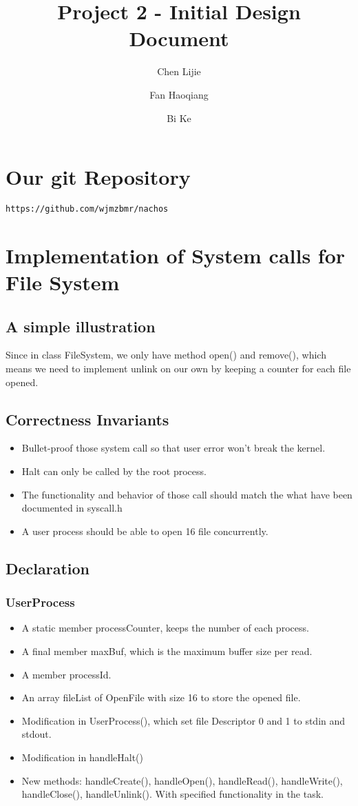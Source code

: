 \documentclass{article}
\title{Project 2 - Initial Design Document}
\author{Chen Lijie\\ \and
	Fan Haoqiang\\ \and
	Bi Ke\\ }
\date{}
\begin{document}
	\maketitle
	\section{Our git Repository}
	\texttt{https://github.com/wjmzbmr/nachos}
	\section{Implementation of System calls for File System}
	\subsection{A simple illustration}
	Since in class FileSystem, we only have method open() and remove(), which means we need to implement unlink on our own by keeping a counter for each file opened.
	\subsection{Correctness Invariants}
	\begin{itemize}
		\item Bullet-proof those system call so that user error won't break the kernel.
		\item Halt can only be called by the root process.
		\item The functionality and behavior of those call should match the what have been documented in syscall.h
		\item A user process should be able to open 16 file concurrently.
	\end{itemize}
	\subsection{Declaration}
	\subsubsection*{UserProcess}
	\begin{itemize}
		\item A static member processCounter, keeps the number of each process.
		\item A final member maxBuf, which is the maximum buffer size per read.
		\item A member processId.
		\item An array fileList of OpenFile with size 16 to store the opened file.
		\item Modification in UserProcess(), which set file Descriptor 0 and 1 to stdin and stdout.
		\item Modification in handleHalt()
		\item New methods: handleCreate(), handleOpen(), handleRead(), handleWrite(), handleClose(), handleUnlink(). With specified functionality in the task.
	\end{itemize}
\end{document}
